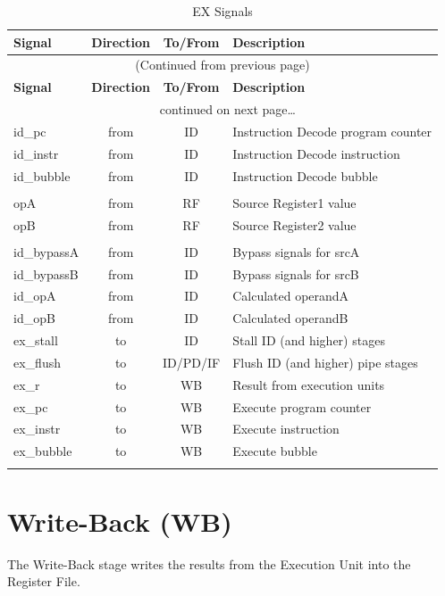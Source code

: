 \begin{longtable}[]{@{}lccl@{}}
	\toprule
	\textbf{Signal} & \textbf{Direction} & \textbf{To/From} & \textbf{Description}\tabularnewline
	\midrule
	\endfirsthead
	\multicolumn{4}{c}{{(Continued from previous page)}} \\
	\toprule
	\textbf{Signal} & \textbf{Direction} & \textbf{To/From} & \textbf{Description}\tabularnewline
	\midrule
	\endhead
	\midrule \multicolumn{4}{c}{{\tablename\ \thetable{} continued on next page\ldots}} \\
	\endfoot
	\endlastfoot
	
		id\_pc & from & ID & Instruction Decode program counter\\
		id\_instr & from & ID & Instruction Decode instruction\\
		id\_bubble & from & ID & Instruction Decode bubble\\
		 &  &  & \\
		opA & from & RF & Source Register1 value\\
		opB & from & RF & Source Register2 value\\
		 &  &  & \\
		id\_bypassA & from & ID & Bypass signals for srcA\\
		id\_bypassB & from & ID & Bypass signals for srcB\\
		id\_opA & from & ID & Calculated operandA\\
		id\_opB & from & ID & Calculated operandB\\
		ex\_stall & to & ID & Stall ID (and higher) stages\\
		ex\_flush & to & ID/PD/IF & Flush ID (and higher) pipe stages\\
		ex\_r & to & WB & Result from execution units\\
		ex\_pc & to & WB & Execute program counter\\
		ex\_instr & to & WB & Execute instruction\\
		ex\_bubble & to & WB & Execute bubble\\
	\bottomrule
	\caption{EX Signals}
	\label{tab:ex-signals}
\end{longtable}

\pagebreak

\section{Write-Back (WB)}\label{write-back-wb-1}

The Write-Back stage writes the results from the Execution Unit into the Register File.

